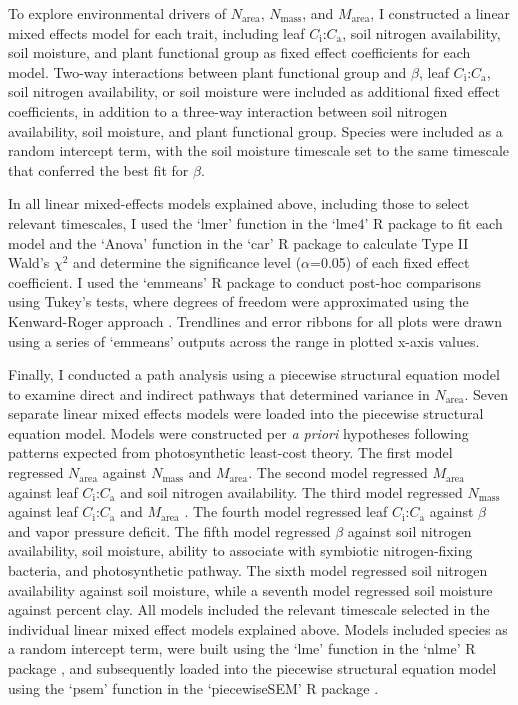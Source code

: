 To explore environmental drivers of $N_\mathrm{area}$, $N_\mathrm{mass}$, and $M_\mathrm{area}$, I constructed a linear mixed effects model for each trait, including leaf $C_\mathrm{i}$:$C_\mathrm{a}$, soil nitrogen availability, soil moisture, and plant functional group as fixed effect coefficients for each model. Two-way interactions between plant functional group and $\beta$, leaf $C_\mathrm{i}$:$C_\mathrm{a}$, soil nitrogen availability, or soil moisture were included as additional fixed effect coefficients, in addition to a three-way interaction between soil nitrogen availability, soil moisture, and plant functional group. Species were included as a random intercept term, with the soil moisture timescale set to the same timescale that conferred the best fit for $\beta$.

In all linear mixed-effects models explained above, including those to select relevant timescales, I used the `lmer' function in the `lme4' R package  to fit each model and the `Anova' function in the `car' R package  to calculate Type II Wald's $\chi^2$ and determine the significance level ($\alpha$=0.05) of each fixed effect coefficient. I used the `emmeans' R package  to conduct post-hoc comparisons using Tukey's tests, where degrees of freedom were approximated using the Kenward-Roger approach . Trendlines and error ribbons for all plots were drawn using a series of `emmeans’ outputs across the range in plotted x-axis values.

Finally, I conducted a path analysis using a piecewise structural equation model to examine direct and indirect pathways that determined variance in $N_\mathrm{area}$. Seven separate linear mixed effects models were loaded into the piecewise structural equation model. Models were constructed per \textit{a priori} hypotheses following patterns expected from photosynthetic least-cost theory. The first model regressed $N_\mathrm{area}$ against $N_\mathrm{mass}$ and $M_\mathrm{area}$. The second model regressed $M_\mathrm{area}$ against leaf $C_\mathrm{i}$:$C_\mathrm{a}$ and soil nitrogen availability. The third model regressed $N_\mathrm{mass}$ against leaf $C_\mathrm{i}$:$C_\mathrm{a}$ and $M_\mathrm{area}$ . The fourth model regressed leaf $C_\mathrm{i}$:$C_\mathrm{a}$ against $\beta$ and vapor pressure deficit. The fifth model regressed $\beta$ against soil nitrogen availability, soil moisture, ability to associate with symbiotic nitrogen-fixing bacteria, and photosynthetic pathway. The sixth model regressed soil nitrogen availability against soil moisture, while a seventh model regressed soil moisture against percent clay. All models included the relevant timescale selected in the individual linear mixed effect models explained above. Models included species as a random intercept term, were built using the `lme’ function in the `nlme’ R package , and subsequently loaded into the piecewise structural equation model using the `psem’ function in the `piecewiseSEM’ R package .
\clearpage

